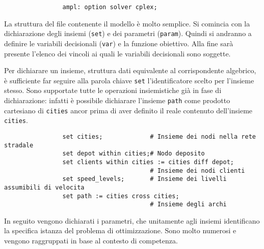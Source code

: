 			\begin{verbatim}
				ampl: option solver cplex;
			\end{verbatim}

			La struttura del file contenente il modello è molto semplice. 
			Si comincia con la dichiarazione degli insiemi (\texttt{set}) e dei parametri (\texttt{param}). Quindi si andranno a definire le variabili decisionali (\texttt{var}) e la funzione obiettivo. Alla fine sarà presente l’elenco dei vincoli ai quali le variabili decisionali sono soggette.

			Per dichiarare un insieme, struttura dati equivalente al corrispondente algebrico,  è sufficiente far seguire alla parola chiave \texttt{set} l’identificatore scelto per l’insieme stesso. Sono supportate tutte le operazioni insiemistiche già in fase di dichiarazione: infatti è possibile dichiarare l’insieme \texttt{path} come prodotto cartesiano di \texttt{cities} ancor prima di aver definito il reale contenuto dell’insieme \texttt{cities}.

			\begin{verbatim}
				set cities;				# Insieme dei nodi nella rete stradale
				set depot within cities;# Nodo deposito
				set clients within cities := cities diff depot;	
										# Insieme dei nodi clienti
				set speed_levels;		# Insieme dei livelli assumibili di velocita
				set path := cities cross cities;	
										# Insieme degli archi			
			\end{verbatim}

			In seguito vengono dichiarati i parametri, che unitamente agli insiemi identificano la specifica istanza del problema di ottimizzazione. Sono molto numerosi e vengono raggruppati in base al contesto di competenza.

